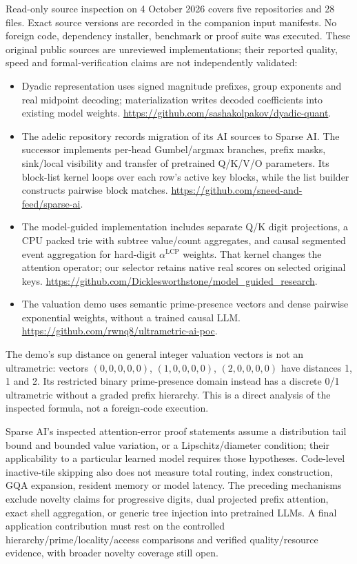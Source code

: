 \documentclass[11pt]{article}
\begin{document}
Read-only source inspection on 4 October 2026 covers five repositories and
28 files. Exact source versions are recorded in the companion input manifests.
No foreign code, dependency installer, benchmark or proof suite was executed.
These original public sources are unreviewed implementations; their reported
quality, speed and formal-verification claims are not independently validated:
\begin{itemize}
\item Dyadic representation uses signed magnitude prefixes,
group exponents and real midpoint decoding; materialization writes decoded
coefficients into existing model weights.
\url{https://github.com/sashakolpakov/dyadic-quant}.
\item The adelic repository records migration of its AI sources to Sparse AI. The successor implements per-head
Gumbel/argmax branches, prefix masks, sink/local visibility and transfer of
pretrained Q/K/V/O parameters. Its block-list kernel loops over each row's
active key blocks, while the list builder constructs pairwise block matches.
\url{https://github.com/sneed-and-feed/sparse-ai}.
\item The model-guided implementation includes separate
Q/K digit projections, a CPU packed trie with subtree value/count aggregates,
and causal segmented event aggregation for hard-digit \(\alpha^{\mathrm{LCP}}\)
weights. That kernel changes the attention operator; our selector retains
native real scores on selected original keys.
\url{https://github.com/Dicklesworthstone/model_guided_research}.
\item The valuation demo uses semantic prime-presence vectors
and dense pairwise exponential weights, without a trained causal LLM.
\url{https://github.com/rwnq8/ultrametric-ai-poc}.
\end{itemize}
The demo's sup distance on general integer valuation vectors is not an
ultrametric: vectors \((0,0,0,0,0)\), \((1,0,0,0,0)\), \((2,0,0,0,0)\)
have distances 1, 1 and 2. Its restricted binary prime-presence domain instead
has a discrete 0/1 ultrametric without a graded prefix hierarchy. This is a
direct analysis of the inspected formula, not a foreign-code execution.

Sparse AI's inspected attention-error proof statements assume a distribution
tail bound and bounded value variation, or a Lipschitz/diameter condition;
their applicability to a particular learned model requires those hypotheses.
Code-level inactive-tile skipping also does not measure total routing,
index construction, GQA expansion, resident memory or model latency.
The preceding mechanisms exclude novelty claims for progressive digits,
dual projected prefix attention, exact shell aggregation, or generic tree
injection into pretrained LLMs. A final application contribution must rest
on the controlled hierarchy/prime/locality/access comparisons and verified
quality/resource evidence, with broader novelty coverage still open.
\end{document}
